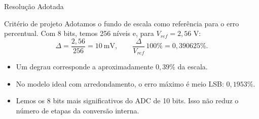 \begin{frame}{Resolução Adotada}
\begin{block}{Critério de projeto}
Adotamos o fundo de escala como referência para o erro percentual.
Com 8 bits, temos 256 níveis e, para $V_{ref}=2{,}56$ V:
\[
\Delta=\frac{2{,}56}{256}=10\ \text{mV},\qquad
\frac{\Delta}{V_{ref}}\,100\%=0{,}390625\%.
\]
\end{block}
\begin{itemize}
\item Um degrau corresponde a aproximadamente $0{,}39\%$ da escala.
\item No modelo ideal com arredondamento, o erro máximo é meio LSB: $0{,}1953\%$.
\item Lemos os 8 bits mais significativos do ADC de 10 bits. Isso não reduz o número de etapas da conversão interna.
\end{itemize}
\end{frame}
